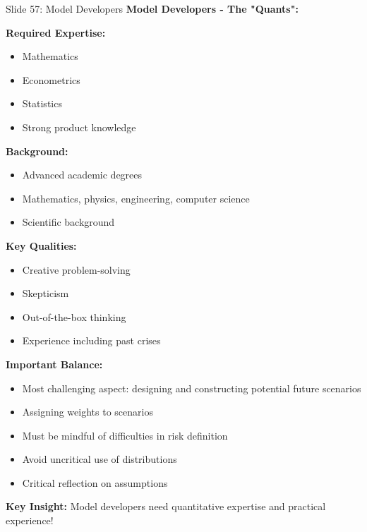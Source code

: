 \documentclass[8pt]{beamer}
\begin{document}
	\begin{frame}{Slide 57: Model Developers}
		\fontsize{6.5}{7.5}\selectfont
		\textbf{Model Developers - The "Quants":}
		
		\vspace{0.1cm}
		\textbf{Required Expertise:}
		\begin{itemize}
			\item Mathematics
			\item Econometrics
			\item Statistics
			\item Strong product knowledge
		\end{itemize}
		
		\vspace{0.1cm}
		\textbf{Background:}
		\begin{itemize}
			\item Advanced academic degrees
			\item Mathematics, physics, engineering, computer science
			\item Scientific background
		\end{itemize}
		
		\vspace{0.1cm}
		\textbf{Key Qualities:}
		\begin{itemize}
			\item Creative problem-solving
			\item Skepticism
			\item Out-of-the-box thinking
			\item Experience including past crises
		\end{itemize}
		
		\vspace{0.1cm}
		\textbf{Important Balance:}
		\begin{itemize}
			\item Most challenging aspect: designing and constructing potential future scenarios
			\item Assigning weights to scenarios
			\item Must be mindful of difficulties in risk definition
			\item Avoid uncritical use of distributions
			\item Critical reflection on assumptions
		\end{itemize}
		
		\textcolor{myblue}{\textbf{Key Insight:}} Model developers need \textcolor{myblue}{quantitative expertise and practical experience}!
	\end{frame}
	
\end{document}
